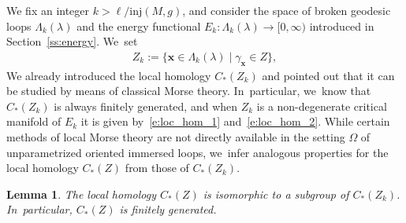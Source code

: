 \documentclass[11pt]{article}
\let\sep\mid
\let\bm\boldsymbol
\newcommand{\xx}{\bm{x}}
\newcommand{\inj}{\mathrm{inj}}
\theoremstyle{plain}
\newtheorem{Lemma}[Thm]{Lemma}
\theoremstyle{definition}
\begin{document}
We fix an integer $k>\ell/\inj(M,g)$, and consider the space of broken geodesic loops $\Lambda_k(\lambda)$ and the energy functional $E_k:\Lambda_k(\lambda)\to[0,\infty)$ introduced in Section~\ref{ss:energy}. We~set
\begin{align*}
Z_k:=\big\{\xx\in\Lambda_k(\lambda)\sep \gamma_{\xx}\in Z \big\},
\end{align*}
We already introduced the local homology $C_*(Z_k)$ and pointed out that it can be studied by means of classical Morse theory. In~particular, we~know that $C_*(Z_k)$ is always finitely generated, and when $Z_k$ is a non-degenerate critical manifold of $E_k$ it is given by~\eqref{e:loc_hom_1} and~\eqref{e:loc_hom_2}. While certain methods of local Morse theory are not directly available in the setting $\Omega$ of unparametrized oriented immersed loops, we~infer analogous properties for the local homology $C_*(Z)$ from those of $C_*(Z_k)$.

\begin{Lemma}\label{l:finitely_generated}
The local homology $C_*(Z)$ is isomorphic to a subgroup of $C_*(Z_k)$. In~particular, $C_*(Z)$ is finitely generated.
\end{Lemma}
\end{document}
